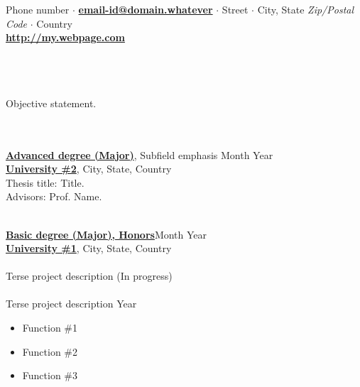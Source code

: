 \documentclass[letterpaper,10pt]{article}
\begin{document}

\hspace{0.0in}\\
{\begin{center} \\
\vspace{0.1cm}
Phone number $\cdot$ {\bf \href{mailto:email-id@domain.whatever}{email-id@domain.whatever}} $\cdot$ Street $\cdot$ City, State {\it Zip/Postal Code} $\cdot$ Country \\
{\bf \url{http://my.webpage.com}}
\end{center} }\ \\
\vspace{-0.40in}\hspace{0cm}\\

\hspace{-1.5cm}{\bf OBJECTIVE}\\
Objective statement.

\vspace{-0.4cm}\hspace{0cm}\\

\hspace{-1.5cm}{\bf EDUCATION}\\
\href{http://university1.edu}{\bf \color{black} Advanced degree (Major)}, Subfield emphasis \hfill Month Year \\
\href{http://university1.edu}{\bf \color{black} University \#2}, City, State, Country \\
Thesis title: Title.\\
Advisors: Prof. Name.

\hspace{0cm}\\
\href{http://university1.edu}{\bf \color{black} Basic degree (Major), Honors}\hfill Month Year \\
\href{http://university1.edu}{\bf \color{black} University \#1}, City, State, Country \\

\hspace{-1.5cm}{\bf PROJECT EXPERIENCE}\\
Terse project description \hfill (In progress) \vspace{-0.2cm}\\

\vspace{-0.45cm}\hspace{0cm}\\
Terse project description \hfill Year \vspace{-0.2cm}
\begin{itemize} \itemsep -4pt
\item Function \#1
\item Function \#2
\item Function \#3
\end{itemize}
\end{document}
